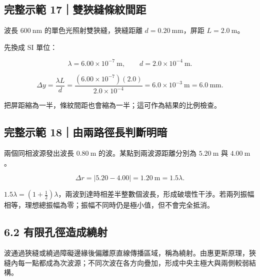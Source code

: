 \documentclass[11pt,a4paper]{article}
\begin{document}
\begin{HandoutWorkedExample}

\subsection{完整示範 17｜雙狹縫條紋間距}\label{ux5b8cux6574ux793aux7bc4-17ux96d9ux72f9ux7e2bux689dux7d0bux9593ux8ddd}

波長 \(600\ \mathrm{nm}\) 的單色光照射雙狹縫，狹縫距離 \(d=0.20\ \mathrm{mm}\)，屏距 \(L=2.0\ \mathrm m\)。

先換成 SI 單位：

\[
\lambda=6.00\times10^{-7}\ \mathrm m,
\qquad
d=2.0\times10^{-4}\ \mathrm m.
\]

\[
\Delta y
=\frac{\lambda L}{d}
=\frac{(6.00\times10^{-7})(2.0)}{2.0\times10^{-4}}
=6.0\times10^{-3}\ \mathrm m
=6.0\ \mathrm{mm}.
\]

把屏距縮為一半，條紋間距也會縮為一半；這可作為結果的比例檢查。

\end{HandoutWorkedExample}

\begin{HandoutWorkedExample}

\subsection{完整示範 18｜由兩路徑長判斷明暗}\label{ux5b8cux6574ux793aux7bc4-18ux7531ux5169ux8defux5f91ux9577ux5224ux65b7ux660eux6697}

兩個同相波源發出波長 \(0.80\ \mathrm m\) 的波。某點到兩波源距離分別為 \(5.20\ \mathrm m\) 與 \(4.00\ \mathrm m\)。

\[
\Delta r=|5.20-4.00|=1.20\ \mathrm m
=1.5\lambda.
\]

\(1.5\lambda=(1+\tfrac12)\lambda\)，兩波到達時相差半整數個波長，形成破壞性干涉。若兩列振幅相等，理想總振幅為零；振幅不同時仍是極小值，但不會完全抵消。

\end{HandoutWorkedExample}

\subsection{6.2 有限孔徑造成繞射}\label{ux6709ux9650ux5b54ux5f91ux9020ux6210ux7e5eux5c04}

波通過狹縫或繞過障礙邊緣後偏離原直線傳播區域，稱為繞射。由惠更斯原理，狹縫內每一點都成為次波源；不同次波在各方向疊加，形成中央主極大與兩側較弱結構。
\end{document}
